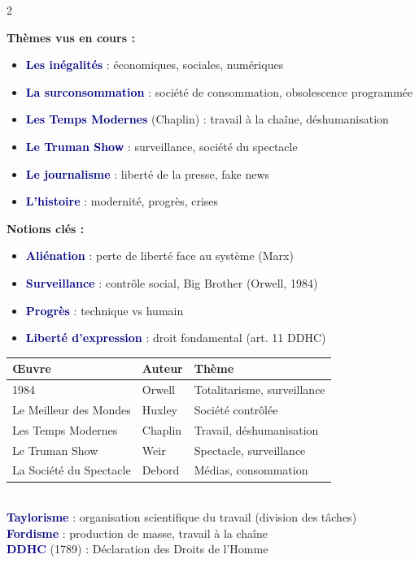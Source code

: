 \documentclass[a4paper,10pt]{article}
\newcommand{\key}[1]{\textbf{\textcolor{navy}{#1}}}
\begin{document}
\begin{multicols}{2}
\begin{tcolorbox}[basebox, colframe=brown, title=2. Culture G — Thèmes traités]
\textbf{Thèmes vus en cours :}
\begin{itemize}
  \item \key{Les inégalités} : économiques, sociales, numériques
  \item \key{La surconsommation} : société de consommation, obsolescence programmée
  \item \key{Les Temps Modernes} (Chaplin) : travail à la chaîne, déshumanisation
  \item \key{Le Truman Show} : surveillance, société du spectacle
  \item \key{Le journalisme} : liberté de la presse, fake news
  \item \key{L'histoire} : modernité, progrès, crises
\end{itemize}
\vspace{4pt}
\textbf{Notions clés :}
\begin{itemize}
  \item \key{Aliénation} : perte de liberté face au système (Marx)
  \item \key{Surveillance} : contrôle social, Big Brother (Orwell, 1984)
  \item \key{Progrès} : technique vs humain
  \item \key{Liberté d'expression} : droit fondamental (art. 11 DDHC)
\end{itemize}
\end{tcolorbox}

\begin{tcolorbox}[basebox, colframe=darkred, title=3. Culture G — Auteurs et œuvres de référence]
\begin{tabular}{lll}
\toprule
\textbf{Œuvre} & \textbf{Auteur} & \textbf{Thème} \\
\midrule
1984 & Orwell & Totalitarisme, surveillance \\
Le Meilleur des Mondes & Huxley & Société contrôlée \\
Les Temps Modernes & Chaplin & Travail, déshumanisation \\
Le Truman Show & Weir & Spectacle, surveillance \\
La Société du Spectacle & Debord & Médias, consommation \\
\bottomrule
\end{tabular}
\vspace{4pt}\\
\key{Taylorisme} : organisation scientifique du travail (division des tâches) \\
\key{Fordisme} : production de masse, travail à la chaîne \\
\key{DDHC} (1789) : Déclaration des Droits de l'Homme
\end{tcolorbox}


\end{multicols}
\end{document}
